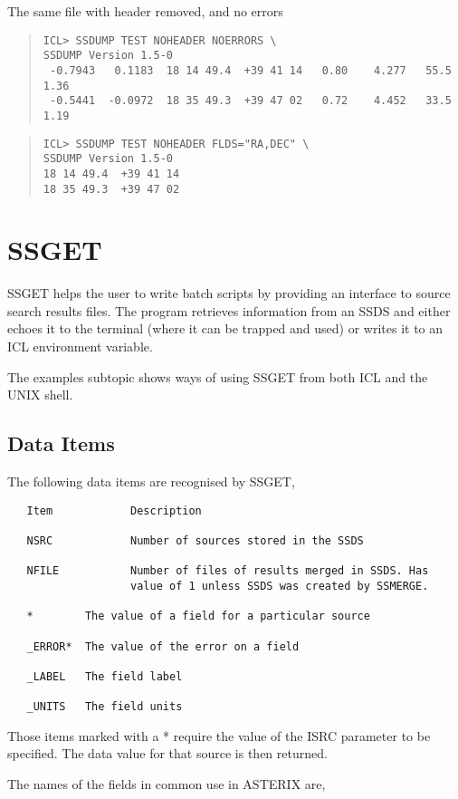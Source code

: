 \documentclass{book}
\renewcommand{\_}{{\tt\char'137}}     %
\begin{document}
The same file with header removed, and no errors
\begin{quote}\begin{verbatim}
ICL> SSDUMP TEST NOHEADER NOERRORS \
SSDUMP Version 1.5-0
 -0.7943   0.1183  18 14 49.4  +39 41 14   0.80    4.277   55.5   1.36
 -0.5441  -0.0972  18 35 49.3  +39 47 02   0.72    4.452   33.5   1.19
\end{verbatim}\end{quote}
\begin{quote}\begin{verbatim}
ICL> SSDUMP TEST NOHEADER FLDS="RA,DEC" \
SSDUMP Version 1.5-0
18 14 49.4  +39 41 14
18 35 49.3  +39 47 02
\end{verbatim}\end{quote}
\section{SSGET}
SSGET helps the user to write batch scripts by providing an interface to
source search results files. The program retrieves information
from an SSDS and either echoes it to the terminal (where it can be
trapped and used) or writes it to an ICL environment variable.

The examples subtopic shows ways of using SSGET from both ICL and
the UNIX shell.

\subsection{Data Items}
The following data items are recognised by SSGET,
\begin{verbatim}
   Item            Description

   NSRC            Number of sources stored in the SSDS

   NFILE           Number of files of results merged in SSDS. Has
                   value of 1 unless SSDS was created by SSMERGE.

   *        The value of a field for a particular source

   _ERROR*  The value of the error on a field

   _LABEL   The field label

   _UNITS   The field units
\end{verbatim}
Those items marked with a * require the value of the ISRC parameter
to be specified. The data value for that source is then returned.

The names of the fields in common use in ASTERIX are,
\end{document}
